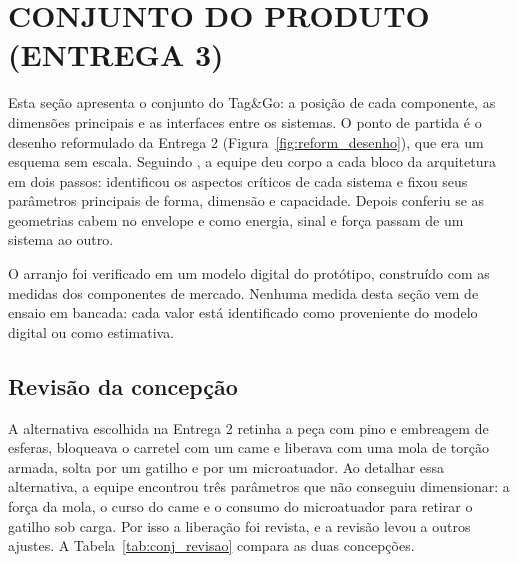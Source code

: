 \section{CONJUNTO DO PRODUTO (ENTREGA 3)}\label{sec:conjunto_produto}


Esta seção apresenta o conjunto do Tag\&Go: a posição de cada componente, as dimensões principais e as interfaces entre os sistemas. O ponto de partida é o desenho reformulado da Entrega 2 (Figura~\ref{fig:reform_desenho}), que era um esquema sem escala. Seguindo , a equipe deu corpo a cada bloco da arquitetura em dois passos: identificou os aspectos críticos de cada sistema e fixou seus parâmetros principais de forma, dimensão e capacidade. Depois conferiu se as geometrias cabem no envelope e como energia, sinal e força passam de um sistema ao outro.

O arranjo foi verificado em um modelo digital do protótipo, construído com as medidas dos componentes de mercado. Nenhuma medida desta seção vem de ensaio em bancada: cada valor está identificado como proveniente do modelo digital ou como estimativa.

\subsection{Revisão da concepção}
\label{subsec:conj_revisao}

A alternativa escolhida na Entrega 2 retinha a peça com pino e embreagem de esferas, bloqueava o carretel com um came e liberava com uma mola de torção armada, solta por um gatilho e por um microatuador. Ao detalhar essa alternativa, a equipe encontrou três parâmetros que não conseguiu dimensionar: a força da mola, o curso do came e o consumo do microatuador para retirar o gatilho sob carga. Por isso a liberação foi revista, e a revisão levou a outros ajustes. A Tabela~\ref{tab:conj_revisao} compara as duas concepções.

